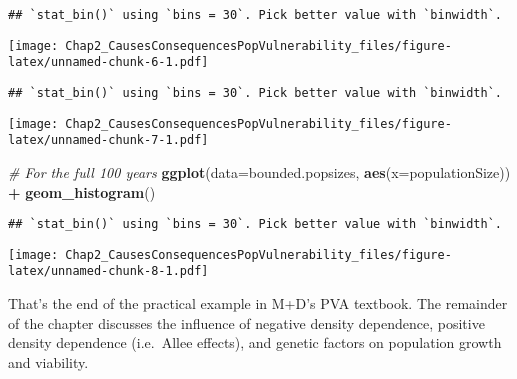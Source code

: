 \documentclass[]{article}
\newenvironment{Shaded}{\begin{snugshade}}{\end{snugshade}}
\newcommand{\KeywordTok}[1]{\textcolor[rgb]{0.13,0.29,0.53}{\textbf{#1}}}
\newcommand{\DataTypeTok}[1]{\textcolor[rgb]{0.13,0.29,0.53}{#1}}
\newcommand{\DecValTok}[1]{\textcolor[rgb]{0.00,0.00,0.81}{#1}}
\newcommand{\StringTok}[1]{\textcolor[rgb]{0.31,0.60,0.02}{#1}}
\newcommand{\CommentTok}[1]{\textcolor[rgb]{0.56,0.35,0.01}{\textit{#1}}}
\newcommand{\OperatorTok}[1]{\textcolor[rgb]{0.81,0.36,0.00}{\textbf{#1}}}
\newcommand{\NormalTok}[1]{#1}
\begin{document}
\begin{verbatim}
## `stat_bin()` using `bins = 30`. Pick better value with `binwidth`.
\end{verbatim}

\texttt{[image: Chap2\_CausesConsequencesPopVulnerability\_files/figure-latex/unnamed-chunk-6-1.pdf]}

\begin{Shaded}
\end{Shaded}

\begin{verbatim}
## `stat_bin()` using `bins = 30`. Pick better value with `binwidth`.
\end{verbatim}

\texttt{[image: Chap2\_CausesConsequencesPopVulnerability\_files/figure-latex/unnamed-chunk-7-1.pdf]}

\begin{Shaded}
\begin{Highlighting}[]
\CommentTok{# For the full 100 years}
\KeywordTok{ggplot}\NormalTok{(}\DataTypeTok{data=}\NormalTok{bounded.popsizes, }\KeywordTok{aes}\NormalTok{(}\DataTypeTok{x=}\NormalTok{populationSize)) }\OperatorTok{+}
\StringTok{  }\KeywordTok{geom_histogram}\NormalTok{()}
\end{Highlighting}
\end{Shaded}

\begin{verbatim}
## `stat_bin()` using `bins = 30`. Pick better value with `binwidth`.
\end{verbatim}

\texttt{[image: Chap2\_CausesConsequencesPopVulnerability\_files/figure-latex/unnamed-chunk-8-1.pdf]}

That's the end of the practical example in M+D's PVA textbook. The
remainder of the chapter discusses the influence of negative density
dependence, positive density dependence (i.e.~Allee effects), and
genetic factors on population growth and viability.
\end{document}

